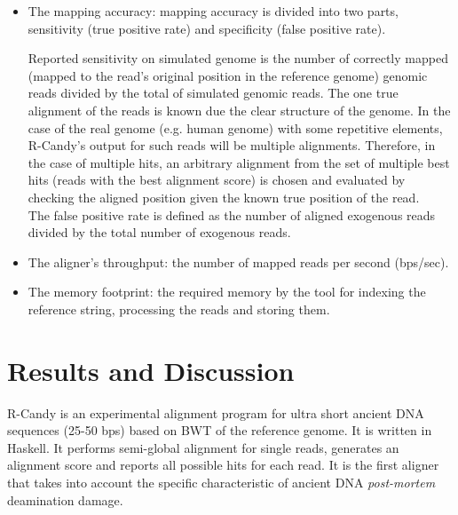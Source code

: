 \documentclass[11pt,a4paper]{report}
\begin{document}
\begin{itemize}

 \item The mapping accuracy: mapping accuracy is divided into two parts, 
 sensitivity (true positive rate) and specificity (false positive rate).

Reported sensitivity on simulated genome is the number of correctly mapped
(mapped to the read's original position in the reference genome) genomic reads 
divided by the total of simulated genomic reads. The one true alignment of the
reads is known due the clear structure of the genome. In the case of the real 
genome (e.g. human genome) with some repetitive elements, R-Candy's output for 
such reads will be multiple alignments. Therefore, in the case of multiple hits, 
an arbitrary alignment from the set of multiple best hits (reads with the best 
alignment score) is chosen and evaluated by checking the aligned position given 
the known true position of the read.\\

The false positive rate is defined as the number of aligned exogenous reads 
divided by the total number of exogenous reads.

 \item The aligner's throughput: the number of mapped reads per second (bps/sec).

 \item The memory footprint: the required memory by the tool for indexing the 
reference string, processing the reads and storing them. 

\end{itemize}
 




\section{Results and Discussion} \label{Results and Discussion}

R-Candy is an experimental alignment program for ultra short ancient DNA sequences 
(25-50 bps) based on BWT of the reference genome. It is written in Haskell. It 
performs semi-global alignment for single reads, generates an alignment score 
and reports all possible hits for each read. It is the first aligner that takes 
into account the specific characteristic of ancient DNA \emph{post-mortem} 
deamination damage.
\end{document}
